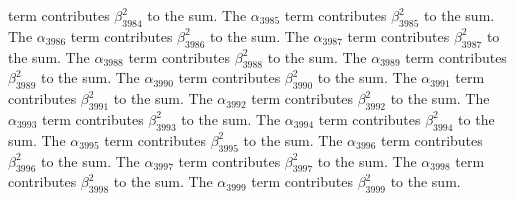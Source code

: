 \begin{lemma}
term contributes $\beta_{3984}^{2}$ to the sum. The $\alpha_{3985}$ term contributes $\beta_{3985}^{2}$ to the sum. The $\alpha_{3986}$ term contributes $\beta_{3986}^{2}$ to the sum. The $\alpha_{3987}$ term contributes $\beta_{3987}^{2}$ to the sum. The $\alpha_{3988}$ term contributes $\beta_{3988}^{2}$ to the sum. The $\alpha_{3989}$ term contributes $\beta_{3989}^{2}$ to the sum. The $\alpha_{3990}$ term contributes $\beta_{3990}^{2}$ to the sum. The $\alpha_{3991}$ term contributes $\beta_{3991}^{2}$ to the sum. The $\alpha_{3992}$ term contributes $\beta_{3992}^{2}$ to the sum. The $\alpha_{3993}$ term contributes $\beta_{3993}^{2}$ to the sum. The $\alpha_{3994}$ term contributes $\beta_{3994}^{2}$ to the sum. The $\alpha_{3995}$ term contributes $\beta_{3995}^{2}$ to the sum. The $\alpha_{3996}$ term contributes $\beta_{3996}^{2}$ to the sum. The $\alpha_{3997}$ term contributes $\beta_{3997}^{2}$ to the sum. The $\alpha_{3998}$ term contributes $\beta_{3998}^{2}$ to the sum. The $\alpha_{3999}$ term contributes $\beta_{3999}^{2}$ to the sum.
\end{lemma}

